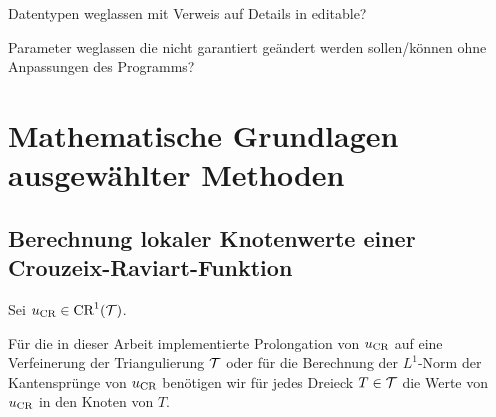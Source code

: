 Datentypen weglassen mit Verweis auf Details in editable?

Parameter weglassen die nicht garantiert geändert werden sollen/können ohne
Anpassungen des Programms?


\section{Mathematische Grundlagen ausgewählter Methoden}
\label{sec:mathematicalBasicsForMethods}


\subsection{Berechnung lokaler Knotenwerte einer Crouzeix-Raviart-Funktion}

Sei $u_\textup{CR}\in\textup{CR}^1(\mathcal{T})$.

Für die in dieser Arbeit implementierte Prolongation von $u_\textup{CR}$ auf eine
Verfeinerung der Triangulierung $\mathcal{T}$ oder für die Berechnung der $L^1$-Norm
der Kantensprünge von $u_\textup{CR}$ benötigen wir für jedes Dreieck $T\in\mathcal{T}$ die
Werte von $u_\textup{CR}$ in den Knoten von $T$. 


